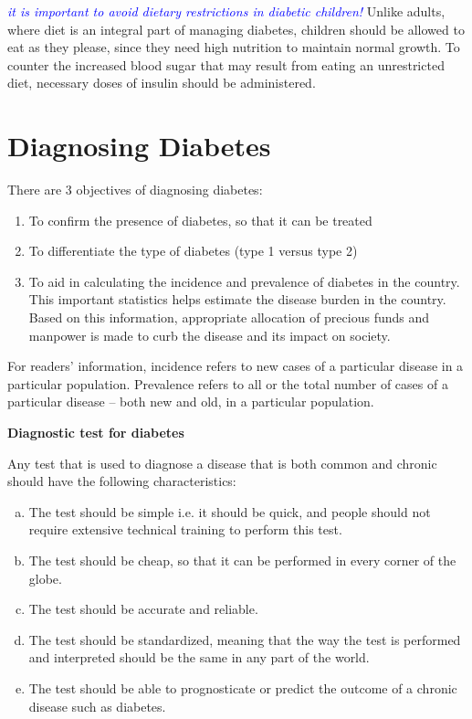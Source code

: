 \textcolor{blue}{\textit{it is important to avoid dietary restrictions in diabetic children!}} Unlike adults, where diet is an integral part of managing diabetes, children should be allowed to eat as they please, since they need high nutrition to maintain normal growth. To counter the increased blood sugar that may result from eating an unrestricted diet, necessary doses of insulin should be administered.



\chapter{Diagnosing Diabetes}\label{chap5}

There are 3 objectives of diagnosing diabetes:

\begin{enumerate}
\itemsep=0pt
\item To confirm the presence of diabetes, so that it can be treated
\item To differentiate the type of diabetes (type 1 versus type 2)
\item To aid in calculating the incidence and prevalence of diabetes in the country. This important statistics helps estimate the disease burden in the country. Based on this information, appropriate allocation of precious funds and manpower is made to curb the disease and its impact on society.
\end{enumerate}

For readers’ information, incidence refers to new cases of a parti\-cular disease in a particular population. Prevalence refers to all or the total number of cases of a particular disease – both new and old, in a particular population.

\noindent
\textbf{Diagnostic test for diabetes}

Any test that is used to diagnose a disease that is both common and chronic should have the following characteristics:

\begin{enumerate}[a.]
\itemsep=0pt
\item The test should be simple i.e. it should be quick, and people should not require extensive technical training to perform this test.
 \item The test should be cheap, so that it can be performed in every corner of the globe.
 \item The test should be accurate and reliable.
 \item The test should be standardized, meaning that the way the test is performed and interpreted should be the same in any part of the world.
 \item The test should be able to prognosticate or predict the outcome of a chronic disease such as diabetes.
 \end{enumerate}

